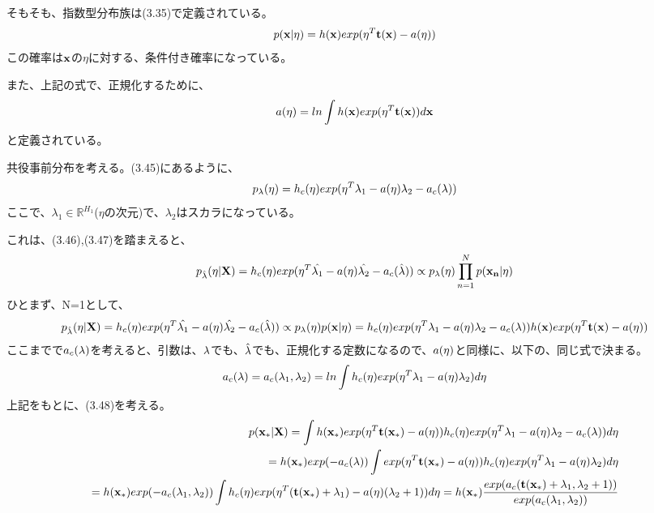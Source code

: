 \documentclass{jsarticle}
\begin{document}
そもそも、指数型分布族は(3.35)で定義されている。
\begin{equation}
p({\bf x}|{\bf \eta})=h({\bf x})exp({\bf \eta}^T {\bf t}({\bf x})-a({\bf \eta}))
\end{equation}
この確率は$\bf x$の$\eta$に対する、条件付き確率になっている。

また、上記の式で、正規化するために、
\begin{equation}
a(\eta) = ln \int h({\bf x})exp({\bf \eta}^T {\bf t}({\bf x}))d{\bf x}
\end{equation}
と定義されている。

共役事前分布を考える。(3.45)にあるように、
\begin{equation}
p_{\lambda}({\bf \eta})=h_c({\bf \eta})exp({\bf \eta}^T {\bf \lambda}_1 - a({\bf \eta}) \lambda_2 - a_c({\bf \lambda}))
\end{equation}
ここで、$\lambda_1 \in {\mathbb R}^{H_1}$($\eta$の次元)で、$\lambda_2$はスカラになっている。

これは、(3.46),(3.47)を踏まえると、
\begin{equation}
p_{\hat{\lambda}}({\bf \eta}|{\bf X})=h_c({\bf \eta})exp({\bf \eta}^T \hat{{\bf \lambda}_1} - a({\bf \eta}) \hat{\lambda_2} - a_c(\hat{\bf \lambda})) \propto 
p_{\lambda}({\bf \eta})\prod_{n=1}^N p({\bf x_n} | {\bf \eta})
\end{equation}
ひとまず、N=1として、
\begin{equation}
p_{\hat{\lambda}}({\bf \eta}|{\bf X})=h_c({\bf \eta})exp({\bf \eta}^T \hat{{\bf \lambda}_1} - a({\bf \eta}) \hat{\lambda_2} - a_c(\hat{\bf \lambda})) \propto 
p_{\lambda}({\bf \eta})p({\bf x} | {\bf \eta}) = h_c({\bf \eta})exp({\bf \eta}^T {\bf \lambda}_1 - a({\bf \eta}) \lambda_2 - a_c({\bf \lambda}))h({\bf x})exp({\bf \eta}^T {\bf t}({\bf x})-a({\bf \eta}))
\end{equation}
ここまでで$a_c({\bf \lambda})$を考えると、引数は、${\bf \lambda}$でも、$\hat{{\bf \lambda}}$でも、正規化する定数になるので、$a({\bf \eta})$と同様に、以下の、同じ式で決まる。
\begin{equation}
a_c({\bf \lambda}) = a_c({\bf \lambda}_1, \lambda_2) = ln \int h_c({\bf \eta})exp({\bf \eta}^T {\bf \lambda}_1 - a({\bf \eta}) \lambda_2) d{\bf \eta}
\end{equation}
上記をもとに、(3.48)を考える。
\begin{equation}
\begin{split}
p({\bf x}_*|{\bf X}) = \int h({\bf x}_*)exp({\bf \eta}^T {\bf t}({\bf x}_*)-a({\bf \eta}))h_c({\bf \eta})exp({\bf \eta}^T {\bf \lambda}_1 - a({\bf \eta}) \lambda_2 - a_c({\bf \lambda})) d{\bf \eta} \\
= h({\bf x}_*) exp(- a_c({\bf \lambda}))\int exp({\bf \eta}^T {\bf t}({\bf x}_*)-a({\bf \eta}))h_c({\bf \eta})exp({\bf \eta}^T {\bf \lambda}_1 - a({\bf \eta}) \lambda_2) d{\bf \eta}\\
= h({\bf x}_*) exp(- a_c({\bf \lambda}_1, \lambda_2)) \int h_c({\bf \eta}) exp({\bf \eta}^T ({\bf t}({\bf x}_*) + {\bf \lambda}_1) - a({\bf \eta})(\lambda_2 + 1)) d{\bf \eta} = h({\bf x}_*) \frac{exp(a_c({\bf t}({\bf x}_*) + {\bf \lambda}_1, \lambda_2 + 1))}{exp(a_c({\bf \lambda}_1, \lambda_2))}
\end{split}
\end{equation}
\end{document}
